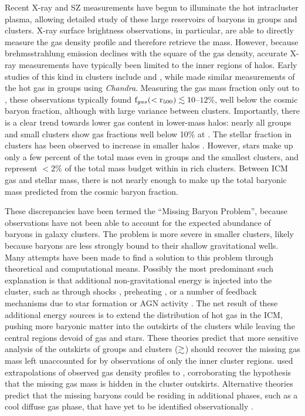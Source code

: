 Recent X-ray and SZ measurements have begun to illuminate the hot
intracluster plasma, allowing detailed study of these large reservoirs
of baryons in groups and clusters. X-ray surface brightness
observations, in particular, are able to directly measure the gas
density profile and therefore retrieve the mass. However, because
brehmsstrahlung emission declines with the square of the gas density,
accurate X-ray measurements have typically been limited to the inner
regions of halos. Early studies of this kind in clusters include
\citet[][with \textit{Chandra}]{Vikhlinin2006} and \citet[][with
  \textit{XMM-Newton}]{Arnaud2007}, while \citet{Sun2009} made similar
measurements of the hot gas in groups using
\textit{Chandra}. Measuring the gas mass fraction only out to
\rfive{}, these observations typically found $\textrm{f\ensuremath{_{gas}}}{}(<\textrm{r\ensuremath{_{500}}}{}) \lesssim
10$--$12\%$, well below the cosmic baryon fraction, although with
large variance between clusters. Importantly, there is a clear trend
towards lower gas content in lower-mass halos: nearly all groups and
small clusters show gas fractions well below 10$\%{}$ at \rfive{}. The
stellar fraction in clusters has been observed to increase in smaller
halos \citep{Giodini2009, Bahcall2014}. However, stars make up only a
few percent of the total mass even in groups and the smallest
clusters, and represent $<2\%$ of the total mass budget within
\rfive{} in rich clusters. Between ICM gas and stellar mass, there is
not nearly enough to make up the total baryonic mass predicted from
the cosmic baryon fraction.



These discrepancies have been termed the ``Missing Baryon Problem'',
because observations have not been able to account for the expected
abundance of baryons in galaxy clusters. The problem is more severe in
smaller clusters, likely because baryons are less strongly bound to
their shallow gravitational wells. Many attempts have been made to
find a solution to this problem through theoretical and computational
means. Possibly the most predominant such explanation is that
additional non-gravitational energy is injected into the cluster, such
as through shocks \citep{Takizawa1998}, preheating \citep{Bialek2001},
or a number of feedback mechanisms due to star formation or AGN
activity \citep{Metzler1994, McCarthy2007, Bode2009}. The net result
of these additional energy sources is to extend the distribution of
hot gas in the ICM, pushing more baryonic matter into the outskirts of
the clusters while leaving the central regions devoid of gas and
stars. These theories predict that more sensitive analysis of the
outskirts of groups and clusters ($\gtrsim$\rvir{}) should recover the
missing gas mass left unaccounted for by observations of only the
inner cluster regions. \citet{Rasheed2011} used extrapolations of
observed gas density profiles to \rvir{}, corroborating the hypothesis
that the missing gas mass is hidden in the cluster
outskirts. Alternative theories predict that the missing baryons could
be residing in additional phases, such as a cool diffuse gas phase,
that have yet to be identified observationally \citep{Afshordi2007,
  Bonamente2005}.


